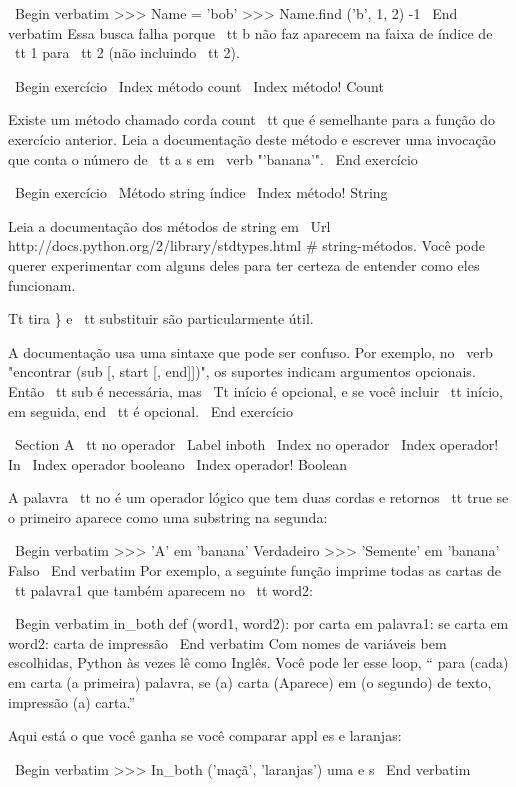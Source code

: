 \documentclass[10pt]{book}
\begin{document}
\begin {itemize}
{{{{{\ Begin {verbatim}
>>> Name = 'bob'
>>> Name.find ('b', 1, 2)
-1
\ End {verbatim}
%
Essa busca falha porque {\ tt b} não faz
aparecem na faixa de índice de {\ tt 1} para {\ tt 2} (não incluindo {\ tt
2}).


\ Begin {} exercício
\ Index {método count}
\ Index {método! Count}

Existe um método chamado corda {count \ tt} que é semelhante
para a função do exercício anterior. Leia a documentação
deste método
e escrever uma invocação que conta o número de {\ tt a} s
em \ verb "'banana'".
\ End {} exercício


\ Begin {} exercício
\ {Método string} índice
\ Index {método! String}

Leia a documentação dos métodos de string em
\ Url {http://docs.python.org/2/library/stdtypes.html # string-métodos}.
Você pode querer experimentar com alguns deles para ter certeza de
entender como eles funcionam. {Tt tira \} e {\ tt substituir} são
particularmente útil.

A documentação usa uma sintaxe que pode ser confuso.
Por exemplo, no \ verb "encontrar (sub [, start [, end]])", os suportes
indicam argumentos opcionais. Então {\ tt sub} é necessária, mas
{\ Tt início} é opcional, e se você incluir {\ tt início},
em seguida, {end \ tt} é opcional.
\ End {} exercício


\ Section {A {\ tt no}} operador
\ Label {} inboth
\ Index {} no operador
\ Index {operador! In}
\ Index {operador booleano}
\ Index {operador! Boolean}

A palavra {\ tt no} é um operador lógico que tem duas cordas e
retornos {\ tt true} se o primeiro aparece como uma substring na segunda:

\ Begin {verbatim}
>>> 'A' em 'banana'
Verdadeiro
>>> 'Semente' em 'banana'
Falso
\ End {verbatim}
%
Por exemplo, a seguinte função imprime todas as
cartas de {\ tt palavra1} que também aparecem no {\ tt word2}:

\ Begin {verbatim}
in_both def (word1, word2):
    por carta em palavra1:
        se carta em word2:
            carta de impressão
\ End {verbatim}
%
Com nomes de variáveis ​​bem escolhidas,
Python às vezes lê como Inglês. Você pode ler
esse loop, `` para (cada) em carta (a primeira) palavra, se (a) carta 
(Aparece) em (o segundo) de texto, impressão (a) carta.''

Aqui está o que você ganha se você comparar appl es e laranjas:

\ Begin {verbatim}
>>> In_both ('maçã', 'laranjas')
uma
e
s
\ End {verbatim}
%

}}}}}}
\end{itemize}
\end{document}
